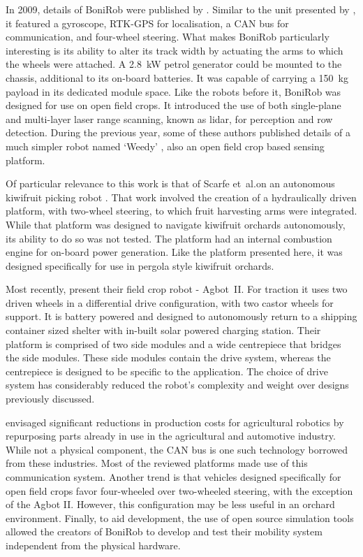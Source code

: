 \documentclass[preprint,authoryear,12pt]{elsarticle}
\begin{document}
        In 2009, details of BoniRob were published by \cite{Ruckelshausen2009}.
        Similar to the unit presented by \cite{Bak2004}, it featured a gyroscope, RTK-GPS for localisation, a CAN bus for communication, and four-wheel steering.
        What makes BoniRob particularly interesting is its ability to alter its track width by actuating the arms to which the wheels were attached.
        A \SI{2.8}{\kilo\watt} petrol generator could be mounted to the chassis, additional to its on-board batteries.
        It was capable of carrying a \SI{150}{\kilo\gram} payload in its dedicated module space.
        Like the robots before it, BoniRob was designed for use on open field crops.
        It introduced the use of both single-plane and multi-layer laser range scanning, known as lidar, for perception and row detection.
        During the previous year, some of these authors published details of a much simpler robot named `Weedy' \citep{Klose2008}, also an open field crop based sensing platform.

        Of particular relevance to this work is that of Scarfe et~al.\@ on an autonomous kiwifruit picking robot \citep{scarfe2009, Scarfe2012}.
        That work involved the creation of a hydraulically driven platform, with two-wheel steering, to which fruit harvesting arms were integrated.
        While that platform was designed to navigate kiwifruit orchards autonomously, its ability to do so was not tested.
        The platform had an internal combustion engine for on-board power generation.
        Like the platform presented here, it was designed specifically for use in pergola style kiwifruit orchards.

        Most recently, \cite{Bawden2017} present their field crop robot - Agbot~II.
        For traction it uses two driven wheels in a differential drive configuration, with two castor wheels for support.
        It is battery powered and designed to autonomously return to a shipping container sized shelter with in-built solar powered charging station.
        Their platform is comprised of two side modules and a wide centrepiece that bridges the side modules.
        These side modules contain the drive system, whereas the centrepiece is designed to be specific to the application.
        The choice of drive system has considerably reduced the robot's complexity and weight over designs previously discussed.

        \cite{Blackmore2007} envisaged significant reductions in production costs for agricultural robotics by repurposing parts already in use in the agricultural and automotive industry.
        While not a physical component, the CAN bus is one such technology borrowed from these industries.
        Most of the reviewed platforms made use of this communication system.
        Another trend is that vehicles designed specifically for open field crops favor four-wheeled over two-wheeled steering, with the exception of the Agbot II.
        However, this configuration may be less useful in an orchard environment.
        Finally, to aid development, the use of open source simulation tools allowed the creators of BoniRob to develop and test their mobility system independent from the physical hardware.
\end{document}
